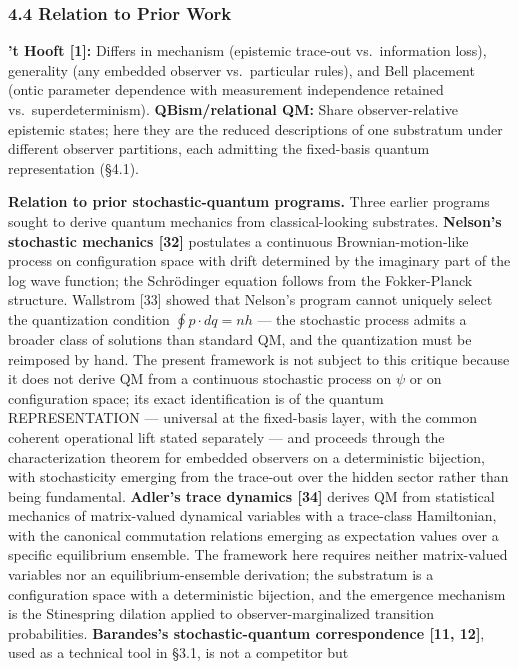 \documentclass[
]{article}
\begin{document}
\hypertarget{relation-to-prior-work}{%
\subsubsection{4.4 Relation to Prior
Work}\label{relation-to-prior-work}}

\textbf{'t Hooft {[}1{]}:} Differs in mechanism (epistemic trace-out
vs.~information loss), generality (any embedded observer vs.~particular
rules), and Bell placement (ontic parameter dependence with measurement
independence retained vs.~superdeterminism). \textbf{QBism/relational
QM:} Share observer-relative epistemic states; here they are the reduced
descriptions of one substratum under different observer partitions, each
admitting the fixed-basis quantum representation (§4.1).

\textbf{Relation to prior stochastic-quantum programs.} Three earlier
programs sought to derive quantum mechanics from classical-looking
substrates. \textbf{Nelson's stochastic mechanics {[}32{]}} postulates a
continuous Brownian-motion-like process on configuration space with
drift determined by the imaginary part of the log wave function; the
Schrödinger equation follows from the Fokker-Planck structure. Wallstrom
{[}33{]} showed that Nelson's program cannot uniquely select the
quantization condition \(\oint p \cdot dq = nh\) --- the stochastic
process admits a broader class of solutions than standard QM, and the
quantization must be reimposed by hand. The present framework is not
subject to this critique because it does not derive QM from a continuous
stochastic process on \(\psi\) or on configuration space; its exact
identification is of the quantum REPRESENTATION --- universal at the
fixed-basis layer, with the common coherent operational lift stated
separately --- and proceeds through the characterization theorem for
embedded observers on a deterministic bijection, with stochasticity
emerging from the trace-out over the hidden sector rather than being
fundamental. \textbf{Adler's trace dynamics {[}34{]}} derives QM from
statistical mechanics of matrix-valued dynamical variables with a
trace-class Hamiltonian, with the canonical commutation relations
emerging as expectation values over a specific equilibrium ensemble. The
framework here requires neither matrix-valued variables nor an
equilibrium-ensemble derivation; the substratum is a configuration space
with a deterministic bijection, and the emergence mechanism is the
Stinespring dilation applied to observer-marginalized transition
probabilities. \textbf{Barandes's stochastic-quantum correspondence
{[}11, 12{]}}, used as a technical tool in §3.1, is not a competitor but
\end{document}
